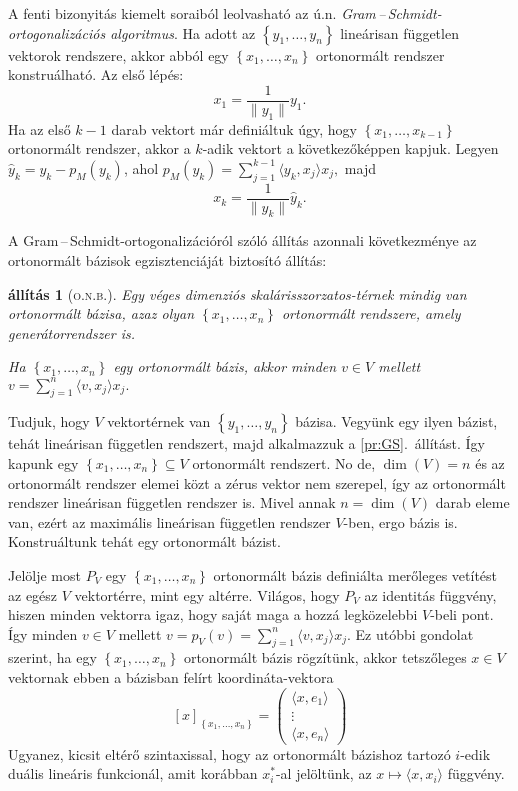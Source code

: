 \documentclass[a4paper, showtrims]{memoir}
\makeatletter
\renewenvironment{proof}[1][\proofname]
    {\par\pushQED{\qed}%
    \normalfont \topsep6\p@\@plus6\p@\relax
    \trivlist
    \item[\hskip\labelsep
        \itshape
    #1\@addpunct{:}]\ignorespaces}
    {\popQED\endtrivlist\@endpefalse}
\theoremstyle{plain}
\newtheorem{proposition}{állítás}[chapter]
\theoremstyle{remark}
\theoremstyle{definition}
\newcommand{\ip}[2]{\langle#1,#2\rangle}
\makeatother
\begin{document}
A fenti bizonyitás kiemelt soraiból leolvasható az ú.n. \emph{Gram\,--\,Schmidt-ortogonalizációs algoritmus}.
Ha adott az $\left\{ y_1,\ldots,y_n \right\}$ lineárisan független vektorok rendszere, akkor abból egy
$\left\{ x_1,\ldots,x_n \right\}$ ortonormált rendszer konstruálható.
Az első lépés:
\[
	x_1=\frac{1}{\|y_1\|}y_1.
\]
Ha az első $k-1$ darab vektort már definiáltuk úgy, hogy $\left\{ x_1,\ldots,x_{k-1} \right\}$ ortonormált rendszer,
akkor a $k$-adik vektort a következőképpen kapjuk.
Legyen $\hat{y}_k=y_k-p_M\left( y_k \right)$,
ahol
$p_M\left( y_k \right)=\sum_{j=1}^{k-1}\ip{y_k}{x_j}x_j,$
majd
\[
	x_k=\frac{1}{\|\hat{y}_k\|}\hat{y}_k.
\]

A Gram\,--\,Schmidt-ortogonalizációról szóló állítás azonnali következménye az ortonormált bázisok egzisztenciáját biztosító állítás:
\begin{proposition}[\textsc{o.n.b.}]\label{pr:onb}
	Egy véges dimenziós skalárisszorzatos-térnek mindig van ortonormált bázisa, azaz olyan $\left\{ x_1,\ldots,x_n \right\}$ ortonormált
	rendszere, amely generátorrendszer is.

	Ha $\left\{ x_1,\ldots,x_n \right\}$ egy ortonormált bázis, akkor minden $v\in V$ mellett
	\(
	v=
	\sum_{j=1}^n\ip{v}{x_j}x_j.
	\)
\end{proposition}
\begin{proof}
	Tudjuk, hogy $V$ vektortérnek van $\left\{ y_1,\ldots,y_n \right\}$ bázisa.
	Vegyünk egy ilyen bázist, tehát lineárisan független rendszert, majd alkalmazzuk a \ref{pr:GS}.~állítást.
	Így kapunk egy
	\begin{math}
		\left\{ x_1,\ldots,x_n \right\}\subseteq V
	\end{math}
	ortonormált rendszert.
	No de, $\dim(V)=n$ és az ortonormált rendszer elemei közt a zérus vektor nem szerepel,
	így az ortonormált rendszer lineárisan független rendszer is.
	Mivel annak $n=\dim(V)$ darab eleme van,
	ezért az maximális lineárisan független rendszer $V$-ben, ergo bázis is.
	Konstruáltunk tehát egy ortonormált bázist.

	Jelölje most $P_V$ egy $\left\{ x_1,\ldots,x_n \right\}$
	ortonormált bázis definiálta merőleges vetítést az egész $V$ vektortérre, mint egy altérre.
	Világos, hogy $P_V$ az identitás függvény,
	hiszen minden vektorra igaz, hogy saját maga a hozzá legközelebbi $V$-beli pont.
	Így minden $v\in V$ mellett $v=p_V\left( v \right)=\sum_{j=1}^n\ip{v}{x_j}x_j.$
\end{proof}
Ez utóbbi gondolat szerint,
ha egy $\left\{ x_1,\ldots,x_n \right\}$ ortonormált bázis rögzítünk,
akkor tetszőleges $x\in V$ vektornak ebben a bázisban felírt koordináta-vektora
\[
	[x]_{\left\{x_1,\ldots,x_n\right\}}
	=
	\begin{pmatrix}
		\ip{x}{e_1} \\ \vdots \\\ip{x}{e_n}
	\end{pmatrix}
\]
Ugyanez, kicsit eltérő szintaxissal, hogy az ortonormált bázishoz tartozó
$i$-edik duális lineáris funkcionál,
amit korábban $x_i^\ast$-al jelöltünk, az $x\mapsto\ip{x}{x_i}$
függvény.
\end{document}
